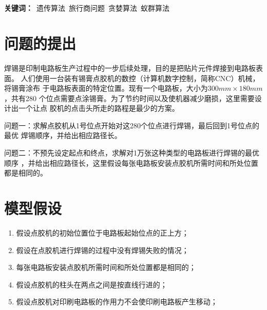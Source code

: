 \documentclass[fontset=windows,a4paper,12pt]{ctexart}
\begin{document}
  \\
  \\
  \textbf{关键词：}\ 遗传算法\ 旅行商问题\ 贪婪算法\ 蚁群算法

  \newpage
  \section{问题的提出}
    焊锡是印制电路板生产过程中的一步后续处理，目的是把贴片元件焊接到电路板表面。
    人们使用一台装有锡膏点胶机的数控（计算机数字控制，简称CNC）机械，将锡膏涂布
    于电路板表面的特定位置。现有一个电路板，大小为$300mm\times180mm$，共有280
    个位点需要点涂锡膏。为了节约时间以及使机器减少磨损，这里需要设计出一个让点
    胶机的点击头所走的路程是最少的方案。

    问题一：求解点胶机从1号位点开始对这280个位点进行焊锡，最后回到1号位点的最优
    焊锡顺序，并给出相应路径长。

    问题二：不预先设定起点和终点，求解对1万张这种类型的电路板进行焊锡的最优顺序
    ，并给出相应路径长，这里假设每张电路板安装点胶机所需时间和所处位置都是相同的。
  \newpage
  
  \section{模型假设}
    \begin{enumerate}
      \item 假设点胶机的初始位置位于电路板起始位点的正上方；
      \item 假设在点胶机进行焊锡的过程中没有焊锡失败的情况；
      \item 每张电路板安装点胶机所需时间和所处位置都是相同的；
      \item 假设点胶机的柱头在两点之间是按直线行进的；
      \item 假设点胶机对印刷电路板的作用力不会使印刷电路板产生移动；
    \end{enumerate}
    
\end{document}
